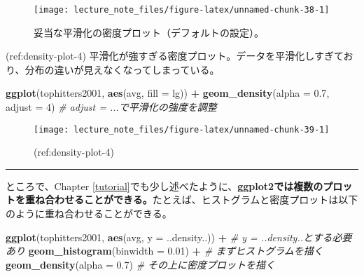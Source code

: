 \documentclass[]{book}
\newenvironment{Shaded}{\begin{snugshade}}{\end{snugshade}}
\newcommand{\KeywordTok}[1]{\textcolor[rgb]{0.13,0.29,0.53}{\textbf{#1}}}
\newcommand{\DataTypeTok}[1]{\textcolor[rgb]{0.13,0.29,0.53}{#1}}
\newcommand{\DecValTok}[1]{\textcolor[rgb]{0.00,0.00,0.81}{#1}}
\newcommand{\FloatTok}[1]{\textcolor[rgb]{0.00,0.00,0.81}{#1}}
\newcommand{\StringTok}[1]{\textcolor[rgb]{0.31,0.60,0.02}{#1}}
\newcommand{\CommentTok}[1]{\textcolor[rgb]{0.56,0.35,0.01}{\textit{#1}}}
\newcommand{\OperatorTok}[1]{\textcolor[rgb]{0.81,0.36,0.00}{\textbf{#1}}}
\newcommand{\NormalTok}[1]{#1}
\begin{document}
\begin{figure}

{\centering \texttt{[image: lecture\_note\_files/figure-latex/unnamed-chunk-38-1]} 

}

\caption{妥当な平滑化の密度プロット（デフォルトの設定）。}\label{fig:unnamed-chunk-38}
\end{figure}

(ref:density-plot-4)
平滑化が強すぎる密度プロット。データを平滑化しすぎており、分布の違いが見えなくなってしまっている。

\begin{Shaded}
\begin{Highlighting}[]
\KeywordTok{ggplot}\NormalTok{(tophitters2001, }\KeywordTok{aes}\NormalTok{(avg, }\DataTypeTok{fill =}\NormalTok{ lg)) }\OperatorTok{+}
\StringTok{  }\KeywordTok{geom_density}\NormalTok{(}\DataTypeTok{alpha =} \FloatTok{0.7}\NormalTok{, }\DataTypeTok{adjust =} \DecValTok{4}\NormalTok{) }\CommentTok{# adjust = ...で平滑化の強度を調整}
\end{Highlighting}
\end{Shaded}

\begin{figure}

{\centering \texttt{[image: lecture\_note\_files/figure-latex/unnamed-chunk-39-1]} 

}

\caption{(ref:density-plot-4)}\label{fig:unnamed-chunk-39}
\end{figure}

\begin{center}\rule{0.5\linewidth}{\linethickness}\end{center}

ところで、Chapter
\ref{tutorial}でも少し述べたように、\textbf{ggplot2では複数のプロットを重ね合わせることができる。}たとえば、ヒストグラムと密度プロットは以下のように重ね合わせることができる。



\begin{Shaded}
\begin{Highlighting}[]
\KeywordTok{ggplot}\NormalTok{(tophitters2001, }\KeywordTok{aes}\NormalTok{(avg, }\DataTypeTok{y =}\NormalTok{ ..density..)) }\OperatorTok{+}\StringTok{ }\CommentTok{# y = ..density..とする必要あり}
\StringTok{  }\KeywordTok{geom_histogram}\NormalTok{(}\DataTypeTok{binwidth =} \FloatTok{0.01}\NormalTok{) }\OperatorTok{+}\StringTok{ }\CommentTok{# まずヒストグラムを描く}
\StringTok{  }\KeywordTok{geom_density}\NormalTok{(}\DataTypeTok{alpha =} \FloatTok{0.7}\NormalTok{) }\CommentTok{# その上に密度プロットを描く}
\end{Highlighting}
\end{Shaded}
\end{document}
